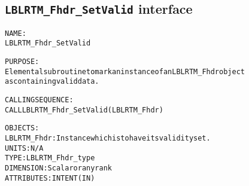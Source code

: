 \subsection{\texttt{LBLRTM\_Fhdr\_SetValid} interface}
  \label{sec:LBLRTM_Fhdr_SetValid_interface}
  \begin{alltt}
 
  NAME:
        LBLRTM_Fhdr_SetValid
 
  PURPOSE:
        Elemental subroutine to mark an instance of an LBLRTM_Fhdr object
        as containing valid data.
 
  CALLING SEQUENCE:
        CALL LBLRTM_Fhdr_SetValid( LBLRTM_Fhdr )
 
  OBJECTS:
        LBLRTM_Fhdr:   Instance which is to have its validity set.
                       UNITS:      N/A
                       TYPE:       LBLRTM_Fhdr_type
                       DIMENSION:  Scalar or any rank
                       ATTRIBUTES: INTENT(IN)
 
  \end{alltt}
